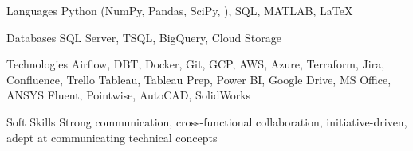 
\begin{cvskills}
  \cvskill
    {Languages} %
    {Python (NumPy, Pandas, SciPy, ), SQL, MATLAB, LaTeX} %
  
  \cvskill
    {Databases} %
    {SQL Server, TSQL, BigQuery, Cloud Storage} %
    
  \cvskill
    {Technologies} %
    {Airflow, DBT, Docker, Git, GCP, AWS, Azure, Terraform, Jira, Confluence, Trello Tableau, Tableau Prep, Power BI, Google Drive, MS Office, ANSYS Fluent, Pointwise, AutoCAD, SolidWorks} %
    
  \cvskill
    {Soft Skills} %
    {Strong communication, cross-functional collaboration, initiative-driven, adept at communicating technical concepts}

\end{cvskills}
